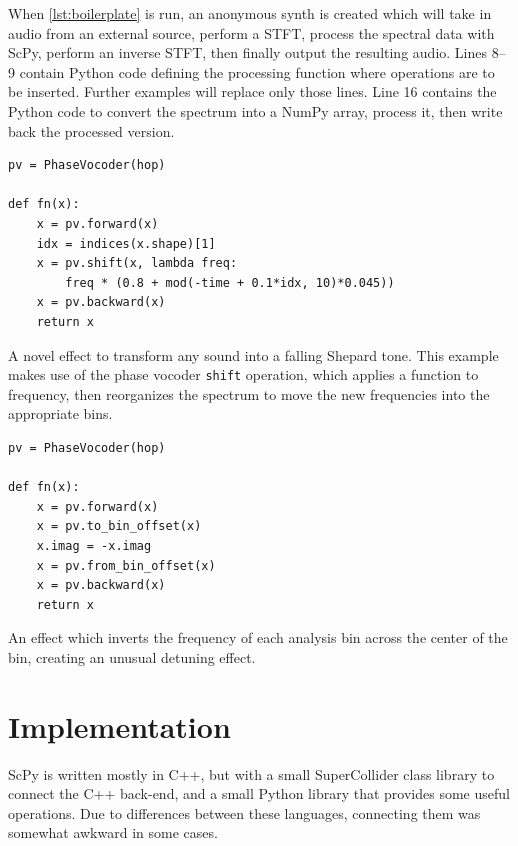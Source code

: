 \documentclass{article}
\begin{document}
When \autoref{lst:boilerplate} is run, an anonymous synth is created which will take in audio
from an external source, perform a STFT, process the spectral data with ScPy, perform an inverse
STFT, then finally output the resulting audio. Lines 8--9 contain Python code defining the
processing function where operations are to be inserted. Further examples will replace only those
lines. Line 16 contains the Python code to convert the spectrum into a NumPy array, process it,
then write back the processed version.

\begin{listing}[H]
    \begin{verbatim}
pv = PhaseVocoder(hop)

def fn(x):
    x = pv.forward(x)
    idx = indices(x.shape)[1]
    x = pv.shift(x, lambda freq:
        freq * (0.8 + mod(-time + 0.1*idx, 10)*0.045))
    x = pv.backward(x)
    return x
    \end{verbatim}
    \caption{A novel effect to transform any sound into a falling Shepard tone. This example makes
    use of the phase vocoder \texttt{shift} operation, which applies a function to frequency, then
    reorganizes the spectrum to move the new frequencies into the appropriate bins.}
    \label{lst:shepard}
\end{listing}

\begin{listing}[H]
    \begin{verbatim}
pv = PhaseVocoder(hop)

def fn(x):
    x = pv.forward(x)
    x = pv.to_bin_offset(x)
    x.imag = -x.imag
    x = pv.from_bin_offset(x)
    x = pv.backward(x)
    return x
    \end{verbatim}
    \caption{An effect which inverts the frequency of each analysis bin across the center of
    the bin, creating an unusual detuning effect.}
    \label{lst:binflipper}
\end{listing}

\section{Implementation}\label{sec:implementation}

ScPy is written mostly in C++, but with a small SuperCollider class library to connect the C++
back-end, and a small Python library that provides some useful operations. Due to differences
between these languages, connecting them was somewhat awkward in some cases.
\end{document}
